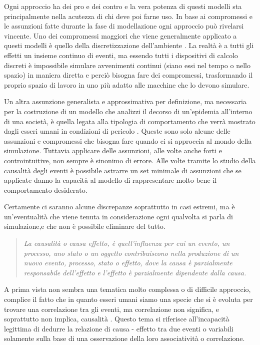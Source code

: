 Ogni approccio ha dei pro e dei contro e la vera potenza di 
questi modelli sta principalmente nella acutezza di chi deve 
poi farne uso. In base ai compromessi e le assunzioni fatte 
durante la fase di modellazione ogni approccio può rivelarsi 
vincente. Uno dei compromessi maggiori che viene generalmente 
applicato a questi modelli è quello della discretizzazione 
dell’ambiente \cite{KONSTANTINOUDIS2020100319}. 
La realtà è a tutti gli effetti un insieme continuo di eventi, 
ma essendo tutti i dispositivi di calcolo discreti è 
impossibile simulare avvenimenti continui 
(siano essi nel tempo o nello spazio) in maniera diretta e 
perciò bisogna fare dei compromessi, trasformando il proprio 
spazio di lavoro in uno più adatto alle macchine che lo devono 
simulare. 

Un altra assunzione generalista e approssimativa per 
definizione, ma necessaria per la costruzione di un modello 
che analizzi il decorso di un’epidemia all’interno di una 
società, è quella legata alla tipologia di comportamento che 
verrà mostrato dagli esseri umani in condizioni di pericolo 
\cite{Tracy2018-lc} \cite{El-Sayed2012-ac}. 
Queste sono solo alcune delle assunzioni e compromessi che 
bisogna fare quando ci si approccia al mondo della simulazione. 
Tuttavia applicare delle assunzioni, alle volte anche forti e 
controintuitive, non sempre è sinonimo di errore. 
Alle volte tramite lo studio della causalità degli eventi 
\cite{Galea2009-lj} \cite{Parascandola2001-kw} è possibile 
astrarre un set minimale di assunzioni che se applicate danno 
la capacità al modello di rappresentare molto bene il 
comportamento desiderato. 

Certamente ci saranno alcune discrepanze soprattutto in casi 
estremi, ma è un’eventualità che viene tenuta in considerazione 
ogni qualvolta si parla di simulazione,e che non è possibile 
eliminare del tutto. 

\begin{quotation}
    \emph{La causalità o causa effetto, è quell’influenza per cui un evento, 
    un processo, uno stato o un oggetto contribuiscono nella produzione 
    di un nuovo evento, processo, stato o effetto, dove la causa è 
    parzialmente responsabile dell’effetto e l’effetto è parzialmente 
    dipendente dalla causa.}
\end{quotation}

A prima vista non sembra una tematica molto complessa o di 
difficile approccio, complice il fatto che in quanto esseri 
umani siamo una specie che si è evoluta per trovare una 
correlazione tra gli eventi, ma correlazione non significa, 
e soprattutto non implica, causalità \cite{Altman2015}. 
Questo tema si riferisce all’incapacità legittima di dedurre 
la relazione di causa - effetto tra due eventi o variabili 
solamente sulla base di una osservazione della loro 
associatività o correlazione. 

